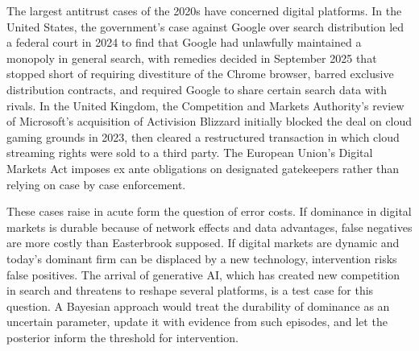 The largest antitrust cases of the 2020s have concerned digital platforms. In the United States, the government's case against Google over search distribution led a federal court in 2024 to find that Google had unlawfully maintained a monopoly in general search, with remedies decided in September 2025 that stopped short of requiring divestiture of the Chrome browser, barred exclusive distribution contracts, and required Google to share certain search data with rivals. In the United Kingdom, the Competition and Markets Authority's review of Microsoft's acquisition of Activision Blizzard initially blocked the deal on cloud gaming grounds in 2023, then cleared a restructured transaction in which cloud streaming rights were sold to a third party. The European Union's Digital Markets Act imposes ex ante obligations on designated gatekeepers rather than relying on case by case enforcement.

These cases raise in acute form the question of error costs. If dominance in digital markets is durable because of network effects and data advantages, false negatives are more costly than Easterbrook supposed. If digital markets are dynamic and today's dominant firm can be displaced by a new technology, intervention risks false positives. The arrival of generative AI, which has created new competition in search and threatens to reshape several platforms, is a test case for this question. A Bayesian approach would treat the durability of dominance as an uncertain parameter, update it with evidence from such episodes, and let the posterior inform the threshold for intervention.

